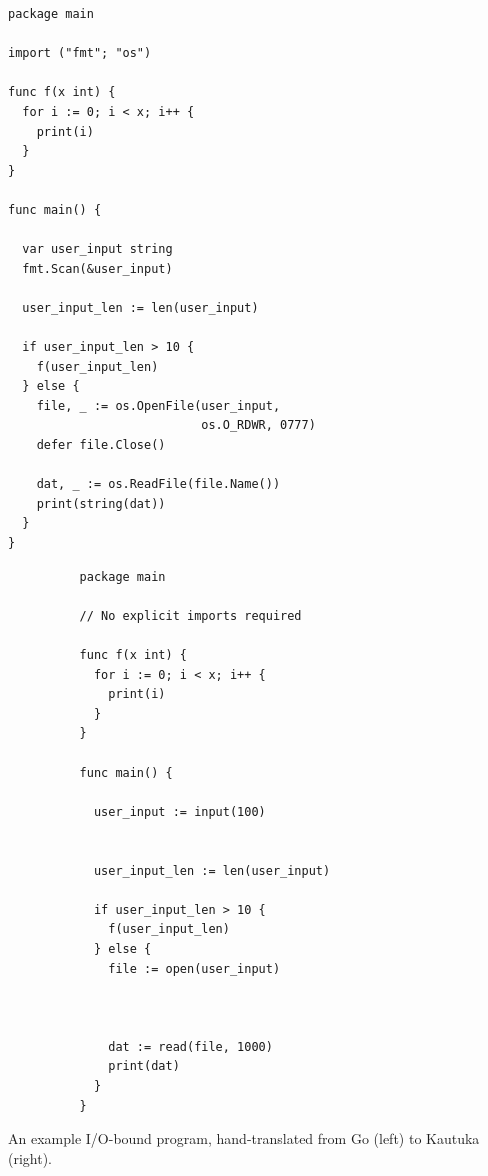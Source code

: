 \begin{listing}[!h]
  {
    \captionsetup[figure]{labelformat=empty}%

    \hspace*{-0.5cm}\begin{minipage}{.5\textwidth}
      \begin{verbatim}
package main 

import ("fmt"; "os") 

func f(x int) {
  for i := 0; i < x; i++ { 
    print(i)
  }
}

func main() { 

  var user_input string 
  fmt.Scan(&user_input)

  user_input_len := len(user_input)

  if user_input_len > 10 { 
    f(user_input_len)
  } else { 
    file, _ := os.OpenFile(user_input,
                           os.O_RDWR, 0777)
    defer file.Close()

    dat, _ := os.ReadFile(file.Name())
    print(string(dat))
  }
}
  \end{verbatim}
      \begin{center}
        \vspace{-4mm}
        \hspace*{-4mm}{(a) Go}
      \end{center}

    \end{minipage}%
    \begin{minipage}{.5\textwidth}
      \begin{verbatim}
          package main 
          
          // No explicit imports required 

          func f(x int) {
            for i := 0; i < x; i++ { 
              print(i)
            }
          }
          
          func main() { 

            user_input := input(100) 
            

            user_input_len := len(user_input)

            if user_input_len > 10 { 
              f(user_input_len)
            } else { 
              file := open(user_input)


              
              dat := read(file, 1000)
              print(dat)
            }
          }
      \end{verbatim}
      \begin{center}
        \vspace{-4mm}
        \hspace*{16mm}{(b) Kautuka}
      \end{center}
    \end{minipage}
  }
  \vspace{2mm}
  \caption{An example I/O-bound program, hand-translated from Go (left) to Kautuka (right).}
  \label{listing:translation}
\end{listing}

